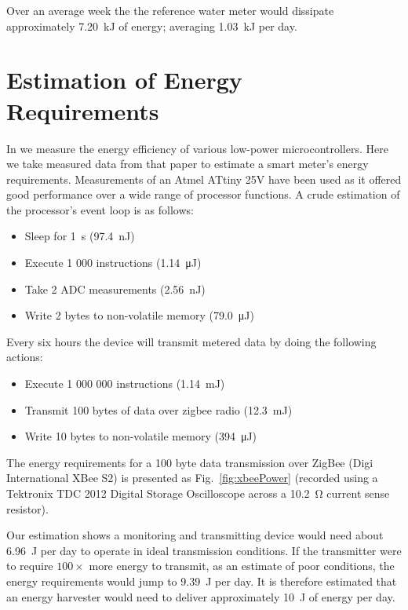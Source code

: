 \documentclass[10pt,final,journal]{IEEEtran}
\begin{document}
    Over an average week the the reference water meter would dissipate approximately \SI{7.20}{\kilo\joule} of energy; averaging \SI{1.03}{\kilo\joule} per day.

    \section{Estimation of Energy Requirements}
    \label{sect:powerRequirements}
    In \cite{Jones2011} we measure the energy efficiency of various low-power microcontrollers.
    Here we take measured data from that paper to estimate a smart meter's energy requirements.
    Measurements of an Atmel ATtiny 25V have been used as it offered good performance over a wide range of processor functions.
    A crude estimation of the processor's event loop is as follows:
    \begin{itemize}
    \item Sleep for \SI{1}{\second} (\SI{97.4}{\nano\joule})
    \item Execute 1 000 instructions (\SI{1.14}{\micro\joule})
    \item Take 2 ADC measurements (\SI{2.56}{\nano\joule})
    \item Write 2 bytes to non-volatile memory (\SI{79.0}{\micro\joule})
    \end{itemize}
    Every six hours the device will transmit metered data by doing the following actions:
    \begin{itemize}
    \item Execute 1 000 000 instructions (\SI{1.14}{\milli\joule})
    \item Transmit 100 bytes of data over zigbee radio (\SI{12.3}{\milli\joule})
    \item Write 10 bytes to non-volatile memory (\SI{394}{\micro\joule})
    \end{itemize}

    The energy requirements for a 100 byte data transmission over ZigBee (Digi International XBee S2) is presented as Fig.~\ref{fig:xbeePower} (recorded using a Tektronix TDC 2012 Digital Storage Oscilloscope across a \SI{10.2}{\ohm} current sense resistor).

    Our estimation shows a monitoring and transmitting device would need about \SI{6.96}{\joule} per day to operate in ideal transmission conditions.
    If the transmitter were to require $100\times$ more energy to transmit, as an estimate of poor conditions, the energy requirements would jump to \SI{9.39}{\joule} per day.
    It is therefore estimated that an energy harvester would need to deliver approximately \SI{10}{\joule} of energy per day.
\end{document}
